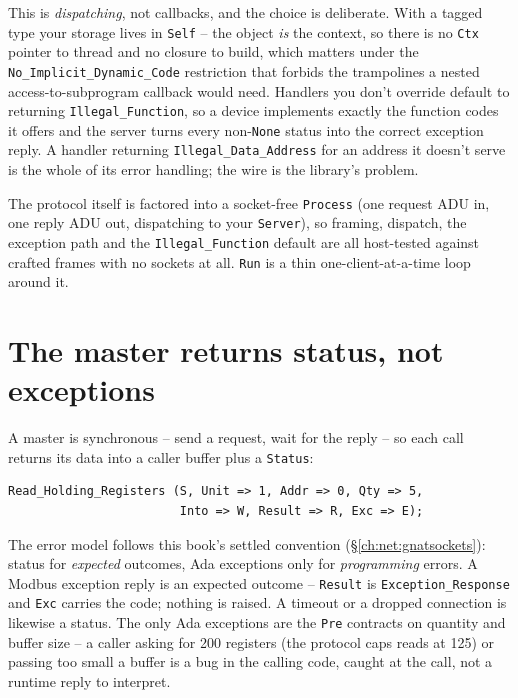This is \emph{dispatching}, not callbacks, and the choice is deliberate. With a tagged
type your storage lives in \texttt{Self} -- the object \emph{is} the context, so there
is no \texttt{Ctx} pointer to thread and no closure to build, which matters under the
\texttt{No\_Implicit\_Dynamic\_Code} restriction that forbids the trampolines a nested
access-to-subprogram callback would need. Handlers you don't override default to
returning \texttt{Illegal\_Function}, so a device implements exactly the function codes
it offers and the server turns every non-\texttt{None} status into the correct
exception reply. A handler returning \texttt{Illegal\_Data\_Address} for an address it
doesn't serve is the whole of its error handling; the wire is the library's problem.

The protocol itself is factored into a socket-free \texttt{Process} (one request ADU in,
one reply ADU out, dispatching to your \texttt{Server}), so framing, dispatch, the
exception path and the \texttt{Illegal\_Function} default are all host-tested against
crafted frames with no sockets at all. \texttt{Run} is a thin one-client-at-a-time loop
around it.

\section{The master returns status, not exceptions}

A master is synchronous -- send a request, wait for the reply -- so each call returns
its data into a caller buffer plus a \texttt{Status}:

\begin{lstlisting}
Read_Holding_Registers (S, Unit => 1, Addr => 0, Qty => 5,
                        Into => W, Result => R, Exc => E);
\end{lstlisting}

The error model follows this book's settled convention (\S\ref{ch:net:gnatsockets}):
status for \emph{expected} outcomes, Ada exceptions only for \emph{programming} errors.
A Modbus exception reply is an expected outcome -- \texttt{Result} is
\texttt{Exception\_Response} and \texttt{Exc} carries the code; nothing is raised. A
timeout or a dropped connection is likewise a status. The only Ada exceptions are the
\texttt{Pre} contracts on quantity and buffer size -- a caller asking for 200 registers
(the protocol caps reads at 125) or passing too small a buffer is a bug in the calling
code, caught at the call, not a runtime reply to interpret.


